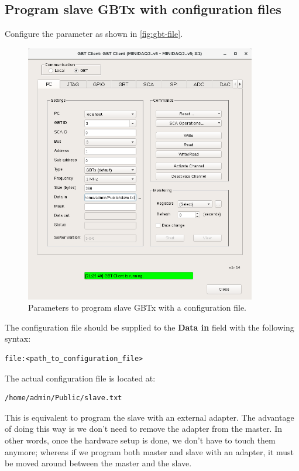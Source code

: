 \subsection{Program slave GBTx with configuration files}
Configure the parameter as shown in \autoref{fig:gbt-file}.

\begin{figure}[ht]
	\centering
    \includegraphics[width=0.9\textwidth]{res/gbt_client_slave_program_via_config_file.png}
	\caption{Parameters to program slave GBTx with a configuration file.}
	\label{fig:gbt-file}
\end{figure}

The configuration file should be supplied to the \textbf{Data in} field with the
following syntax:
\begin{verbatim}
file:<path_to_configuration_file>
\end{verbatim}

The actual configuration file is located at:
\begin{verbatim}
/home/admin/Public/slave.txt
\end{verbatim}

\begin{leftbar}
    This is equivalent to program the slave with an external \itwoc adapter.
    The advantage of doing this way is we don't need to remove the \itwoc
    adapter from the master.
    In other words, once the hardware setup is done, we don't have to touch them
    anymore; whereas if we program both master and slave with an \itwoc adapter,
    it must be moved around between the master and the slave.
\end{leftbar}
